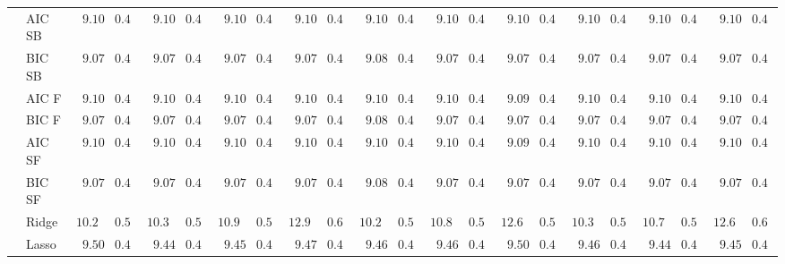\begin{tabular}{llllllllllllllllllllll}
	& AIC SB  & $\phantom{0}9.10$ & $0.40$ & $\phantom{0}9.10$ & $0.40$ & $\phantom{0}9.10$ & $0.40$ & $\phantom{0}9.10$ & $0.40$ & $\phantom{0}9.10$ & $0.40$ & $\phantom{0}9.10$ & $0.40$ & $\phantom{0}9.10$ & $0.40$ & $\phantom{0}9.10$ & $0.40$ & $\phantom{0}9.10$ & $0.40$ & $\phantom{0}9.10$ & $0.40$ \\
	& BIC SB  & $\phantom{0}9.07$ & $0.40$ & $\phantom{0}9.07$ & $0.40$ & $\phantom{0}9.07$ & $0.40$ & $\phantom{0}9.07$ & $0.40$ & $\phantom{0}9.08$ & $0.40$ & $\phantom{0}9.07$ & $0.40$ & $\phantom{0}9.07$ & $0.40$ & $\phantom{0}9.07$ & $0.40$ & $\phantom{0}9.07$ & $0.40$ & $\phantom{0}9.07$ & $0.40$ \\
	& AIC F  & $\phantom{0}9.10$ & $0.40$ & $\phantom{0}9.10$ & $0.40$ & $\phantom{0}9.10$ & $0.40$ & $\phantom{0}9.10$ & $0.40$ & $\phantom{0}9.10$ & $0.40$ & $\phantom{0}9.10$ & $0.40$ & $\phantom{0}9.09$ & $0.40$ & $\phantom{0}9.10$ & $0.40$ & $\phantom{0}9.10$ & $0.40$ & $\phantom{0}9.10$ & $0.40$ \\
	& BIC F  & $\phantom{0}9.07$ & $0.40$ & $\phantom{0}9.07$ & $0.40$ & $\phantom{0}9.07$ & $0.40$ & $\phantom{0}9.07$ & $0.40$ & $\phantom{0}9.08$ & $0.40$ & $\phantom{0}9.07$ & $0.40$ & $\phantom{0}9.07$ & $0.40$ & $\phantom{0}9.07$ & $0.40$ & $\phantom{0}9.07$ & $0.40$ & $\phantom{0}9.07$ & $0.40$ \\
	& AIC SF  & $\phantom{0}9.10$ & $0.40$ & $\phantom{0}9.10$ & $0.40$ & $\phantom{0}9.10$ & $0.40$ & $\phantom{0}9.10$ & $0.40$ & $\phantom{0}9.10$ & $0.40$ & $\phantom{0}9.10$ & $0.40$ & $\phantom{0}9.09$ & $0.40$ & $\phantom{0}9.10$ & $0.40$ & $\phantom{0}9.10$ & $0.40$ & $\phantom{0}9.10$ & $0.40$ \\
	& BIC SF  & $\phantom{0}9.07$ & $0.40$ & $\phantom{0}9.07$ & $0.40$ & $\phantom{0}9.07$ & $0.40$ & $\phantom{0}9.07$ & $0.40$ & $\phantom{0}9.08$ & $0.40$ & $\phantom{0}9.07$ & $0.40$ & $\phantom{0}9.07$ & $0.40$ & $\phantom{0}9.07$ & $0.40$ & $\phantom{0}9.07$ & $0.40$ & $\phantom{0}9.07$ & $0.40$ \\
	& Ridge  & $10.21$ & $0.50$ & $10.30$ & $0.51$ & $10.91$ & $0.59$ & $12.92$ & $0.62$ & $10.29$ & $0.55$ & $10.82$ & $0.59$ & $12.62$ & $0.56$ & $10.30$ & $0.55$ & $10.78$ & $0.59$ & $12.62$ & $0.66$ \\
	& Lasso  & $\phantom{0}9.50$ & $0.45$ & $\phantom{0}9.44$ & $0.45$ & $\phantom{0}9.45$ & $0.47$ & $\phantom{0}9.47$ & $0.44$ & $\phantom{0}9.46$ & $0.47$ & $\phantom{0}9.46$ & $0.45$ & $\phantom{0}9.50$ & $0.44$ & $\phantom{0}9.46$ & $0.47$ & $\phantom{0}9.44$ & $0.47$ & $\phantom{0}9.45$ & $0.44$ \\

\end{tabular}
